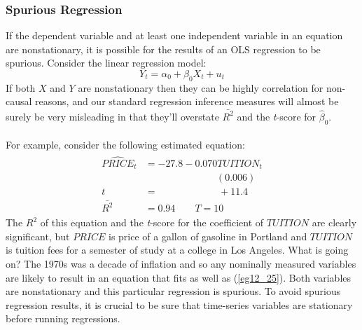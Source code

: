 \documentclass[11pt]{article}
\begin{document}
\subsubsection{Spurious Regression}
If the dependent variable and at least one independent variable in an equation are nonstationary, it is possible for the results of an OLS regression to be spurious. Consider the linear regression model:
\begin{equation}
Y_t = \alpha_0 + \beta_0X_t + u_t \label{eg12_24}
\end{equation}
If both $X$ and $Y$ are nonstationary then they can be highly correlation for non-causal reasons, and our standard regression inference measures will almost be surely be very misleading in that they'll overstate $\bar{R^2}$ and the \textit{t}-score for $\hat{\beta}_0$.\\ \\
For example, consider the following estimated equation:
\begin{align}
\label{eg12_25}
\begin{split}
\widehat{PRICE}_t &= -27.8 - {0.070TUITION_t}\\
&\>\>\>\>\>\>\>\>\>\>\>\>\>\>\>\>\>\>\>\>\>\>\>\>\>\>\>\>\>\>\>\>\> (0.006)\\
t&=\>\>\>\>\>\>\>\>\>\>\>\>\>\>\>\>\>\>\>\>\>\>\>\>\>\>\>\> +11.4\\
\bar{R^2}&= 0.94 \quad\quad T=10
\end{split}
\end{align}
The $R^2$ of this equation and the \textit{t}-score for the coefficient of $TUITION$ are clearly significant, but $PRICE$ is price of a gallon of gasoline in Portland and $TUITION$ is tuition fees for a semester of study at a college in Los Angeles. What is going on? The 1970s was a decade of inflation and so any nominally measured variables are likely to result in an equation that fits as well as (\ref{eg12_25}). Both variables are nonstationary and this particular regression is spurious. To avoid spurious regression results, it is crucial to be sure that time-series variables are stationary before running regressions.
\end{document}
